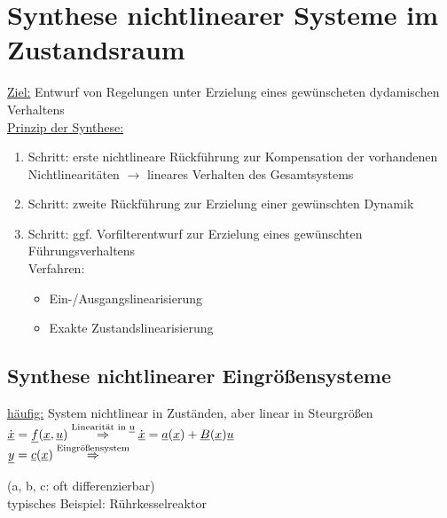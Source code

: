 \documentclass[openany,a4paper,11pt]{book}
\begin{document}
\chapter[Synthese im Zustandsraum]{Synthese nichtlinearer Systeme im Zustandsraum}
\uline{Ziel:} Entwurf von Regelungen unter Erzielung eines gewünscheten dydamischen Verhaltens\\
\uline{Prinzip der Synthese:} \begin{enumerate}
    \item Schritt: erste nichtlineare Rückführung zur Kompensation der vorhandenen Nichtlinearitäten $\rightarrow$ lineares Verhalten des Gesamtsystems
    \item Schritt: zweite Rückführung zur Erzielung einer gewünschten Dynamik
    \item Schritt: ggf. Vorfilterentwurf zur Erzielung eines gewünschten Führungsverhaltens\\
    Verfahren: \begin{itemize}
    \item Ein-/Ausgangslinearisierung
    \item Exakte Zustandslinearisierung
    \end{itemize}
\end{enumerate}
\section[Eingrößensysteme]{Synthese nichtlinearer Eingrößensysteme}
\uline{häufig:} System nichtlinear in Zuständen, aber linear in Steurgrößen\\
$\dot{\uline{x}}=\uline{f}(\uline{x},\uline{u})\stackrel{\text{Linearität in \uline{u}}}{\Rightarrow} \dot{\uline{x}}=\uline{a}(\uline{x})+\uline{B}(\uline{x})\uline{u}$\\
$\uline{y}=\uline{c}(\uline{x}) \stackrel{\text{Eingrößensystem}}{\Rightarrow}$ \\
\begin{minipage}[c]{0.25\textwidth}
\end{minipage} \quad (a, b, c: oft differenzierbar)\\
typisches Beispiel: Rührkesselreaktor 
\end{document}
